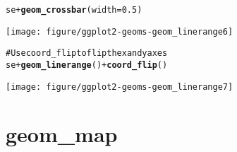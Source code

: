 \documentclass[a4paper,titlepage]{tufte-handout}\usepackage{graphicx, color}
\makeatletter
\def\maxwidth{ %
  \ifdim\Gin@nat@width>\linewidth
    \linewidth
  \else
    \Gin@nat@width
  \fi
}
\newcommand{\hlfunctioncall}[1]{\textcolor[rgb]{0.501960784313725,0,0.329411764705882}{\textbf{#1}}}%
\newcommand{\hlcomment}[1]{\textcolor[rgb]{0.180392156862745,0.6,0.341176470588235}{#1}}%
\newenvironment{kframe}{%
 \def\at@end@of@kframe{}%
 \ifinner\ifhmode%
  \def\at@end@of@kframe{\end{minipage}}%
  \begin{minipage}{\columnwidth}%
 \fi\fi%
 \def\FrameCommand##1{\hskip\@totalleftmargin \hskip-\fboxsep
 \colorbox{shadecolor}{##1}\hskip-\fboxsep
     \hskip-\linewidth \hskip-\@totalleftmargin \hskip\columnwidth}%
 \MakeFramed {\advance\hsize-\width
   \@totalleftmargin\z@ \linewidth\hsize
   \@setminipage}}%
 {\par\unskip\endMakeFramed%
 \at@end@of@kframe}
\newenvironment{knitrout}{}{} %
\makeatother
\begin{document}
\begin{knitrout}
\begin{kframe}
\begin{alltt}
se + \hlfunctioncall{geom_crossbar}(width = 0.5)
\end{alltt}
\end{kframe}\texttt{[image: figure/ggplot2-geoms-geom\_linerange6]} \begin{kframe}\begin{alltt}
\hlcomment{# Use coord_flip to flip the x and y axes}
se + \hlfunctioncall{geom_linerange}() + \hlfunctioncall{coord_flip}()
\end{alltt}
\end{kframe}\texttt{[image: figure/ggplot2-geoms-geom\_linerange7]} 
\end{knitrout}


\section{geom\_map}
\end{document}
